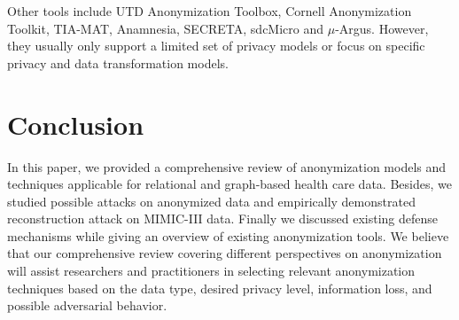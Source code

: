 \documentclass{bioinfo}
\begin{document}
Other tools include UTD Anonymization Toolbox, Cornell Anonymization Toolkit, TIA-MAT, Anamnesia, SECRETA, sdcMicro and $\mu$-Argus. However, they usually only support a limited set of privacy models or focus on specific privacy and data transformation models.



\section{Conclusion}
In this paper, we provided a comprehensive review of anonymization models and techniques applicable for relational and graph-based health care data. Besides, we studied possible attacks on anonymized data and empirically demonstrated reconstruction attack on MIMIC-III data. Finally we discussed existing defense mechanisms while giving an overview of existing anonymization tools. We believe that our comprehensive review covering different perspectives on anonymization will assist researchers and practitioners in selecting relevant anonymization techniques based on the data type, desired privacy level, information loss, and possible adversarial behavior.



\end{document}
